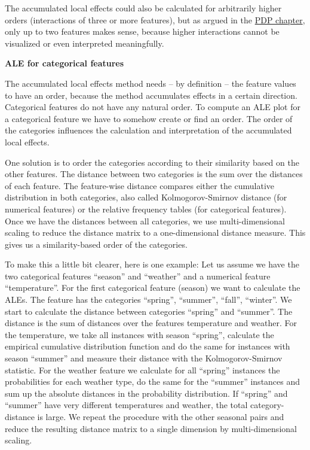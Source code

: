 \documentclass[12pt,]{krantz}
\begin{document}
The accumulated local effects could also be calculated for arbitrarily
higher orders (interactions of three or more features), but as argued in
the \protect\hyperlink{pdp}{PDP chapter}, only up to two features makes
sense, because higher interactions cannot be visualized or even
interpreted meaningfully.

\textbf{ALE for categorical features}

The accumulated local effects method needs -- by definition -- the
feature values to have an order, because the method accumulates effects
in a certain direction. Categorical features do not have any natural
order. To compute an ALE plot for a categorical feature we have to
somehow create or find an order. The order of the categories influences
the calculation and interpretation of the accumulated local effects.

One solution is to order the categories according to their similarity
based on the other features. The distance between two categories is the
sum over the distances of each feature. The feature-wise distance
compares either the cumulative distribution in both categories, also
called Kolmogorov-Smirnov distance (for numerical features) or the
relative frequency tables (for categorical features). Once we have the
distances between all categories, we use multi-dimensional scaling to
reduce the distance matrix to a one-dimensional distance measure. This
gives us a similarity-based order of the categories.

To make this a little bit clearer, here is one example: Let us assume we
have the two categorical features ``season'' and ``weather'' and a
numerical feature ``temperature''. For the first categorical feature
(season) we want to calculate the ALEs. The feature has the categories
``spring'', ``summer'', ``fall'', ``winter''. We start to calculate the
distance between categories ``spring'' and ``summer''. The distance is
the sum of distances over the features temperature and weather. For the
temperature, we take all instances with season ``spring'', calculate the
empirical cumulative distribution function and do the same for instances
with season ``summer'' and measure their distance with the
Kolmogorov-Smirnov statistic. For the weather feature we calculate for
all ``spring'' instances the probabilities for each weather type, do the
same for the ``summer'' instances and sum up the absolute distances in
the probability distribution. If ``spring'' and ``summer'' have very
different temperatures and weather, the total category-distance is
large. We repeat the procedure with the other seasonal pairs and reduce
the resulting distance matrix to a single dimension by multi-dimensional
scaling.
\end{document}
